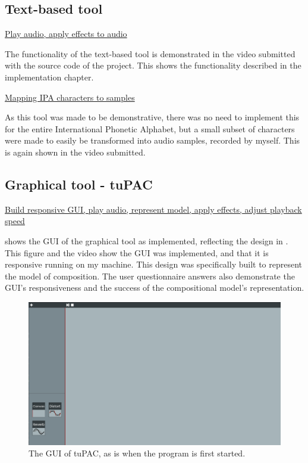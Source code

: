 \documentclass[12pt,a4paper,oneside,openright]{report}
\begin{document}
\subsection{Text-based tool}
\underline{Play audio, apply effects to audio}

The functionality of the text-based tool is demonstrated in the video submitted with the source code of the project. This shows the functionality described in the implementation chapter.

\underline{Mapping IPA characters to samples}

As this tool was made to be demonstrative, there was no need to implement this for the entire International Phonetic Alphabet, but a small subset of characters were made to easily be transformed into audio samples, recorded by myself. This is again shown in the video submitted.

\subsection{Graphical tool - tuPAC}
\underline{Build responsive GUI, play audio, represent model, apply effects, adjust playback speed}

 shows the GUI of the graphical tool as implemented, reflecting the design in . This figure and the video show the GUI was implemented, and that it is responsive running on my machine. This design was specifically built to represent the model of composition. The user questionnaire answers also demonstrate the GUI's responsiveness and the success of the compositional model's representation.

\begin{figure}[h]
    \centering
    \includegraphics[scale=0.3]{images/tuPAC_GUI.png}
    \caption{The GUI of tuPAC, as is when the program is first started.}
    \label{fig:tupac_gui}
\end{figure}
\end{document}
